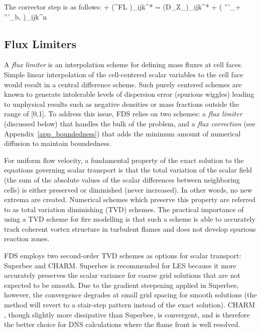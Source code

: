 The corrector step is as follows:
\be {} {\ha \dt}
    + \nabla\!\cdot(^{\rm FL} )_{ijk}^*
    = \nabla\!\cdot (\rho D_\alpha \nabla Z_\alpha)_{ijk}^{*} + \left( '''_\alpha + '''_{\rm b,\alpha} \right)_{ijk}^n
\ee


\subsection{Flux Limiters}
\label{sec_flux_limiters}

A \emph{flux limiter} is an interpolation scheme for defining mass fluxes at cell faces. Simple linear interpolation of the cell-centered scalar variables to the cell face would result in a central difference scheme.  Such purely centered schemes are known to generate intolerable levels of dispersion error (spurious wiggles) leading to unphysical results such as negative densities or mass fractions outside the range of [0,1].  To address this issue, FDS relies on two schemes: a \emph{flux limiter} (discussed below) that handles the bulk of the problem, and a \emph{flux correction} (see Appendix~\ref{app_boundedness}) that adds the minimum amount of numerical diffusion to maintain boundedness.

For uniform flow velocity, a fundamental property of the exact solution to the equations governing scalar transport is that the total variation of the scalar field (the sum of the absolute values of the scalar differences between neighboring cells) is either preserved or diminished (never increased).  In other words, no new extrema are created.  Numerical schemes which preserve this property are referred to as total variation diminishing (TVD) schemes.  The practical importance of using a TVD scheme for fire modelling is that such a scheme is able to accurately track coherent vortex structure in turbulent flames and does not develop spurious reaction zones.

FDS employs two second-order TVD schemes as options for scalar transport: Superbee and CHARM.  Superbee \cite{Roe:1986} is recommended for LES because it more accurately preserves the scalar variance for coarse grid solutions that are not expected to be smooth.  Due to the gradient steepening applied in Superbee, however, the convergence degrades at small grid spacing for smooth solutions (the method will revert to a stair-step pattern instead of the exact solution).  CHARM \cite{Zhou:1995}, though slightly more dissipative than Superbee, is convergent, and is therefore the better choice for DNS calculations where the flame front is well resolved.

